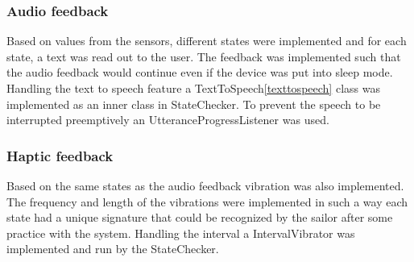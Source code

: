 \subsubsection{Audio feedback}
Based on values from the sensors, different states were implemented and for each state, a text was read out to the user. The feedback was implemented such that the audio feedback would continue even if the device was put into sleep mode. Handling the text to speech feature a TextToSpeech\ref{texttospeech} class was implemented as an inner class in StateChecker. To prevent the speech to be interrupted preemptively an UtteranceProgressListener\cite{utter} was used. 

\subsubsection{Haptic feedback}
Based on the same states as the audio feedback vibration was also implemented. The frequency and length of the vibrations were implemented in such a way each state had a unique signature that could be recognized by the sailor after some practice with the system. Handling the interval a IntervalVibrator was implemented and run by the StateChecker.

